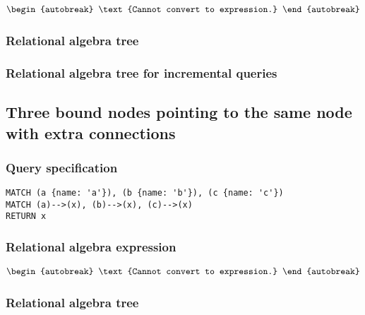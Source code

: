 \begin{align*}
\begin{autobreak}
\text{Cannot convert to expression.}
\end{autobreak}
\end{align*}

\subsubsection*{Relational algebra tree}


\subsubsection*{Relational algebra tree for incremental queries}


\subsection{Three bound nodes pointing to the same node with extra connections}

\subsubsection*{Query specification}

\begin{lstlisting}
MATCH (a {name: 'a'}), (b {name: 'b'}), (c {name: 'c'})
MATCH (a)-->(x), (b)-->(x), (c)-->(x)
RETURN x
\end{lstlisting}

\subsubsection*{Relational algebra expression}

\begin{align*}
\begin{autobreak}
\text{Cannot convert to expression.}
\end{autobreak}
\end{align*}

\subsubsection*{Relational algebra tree}


